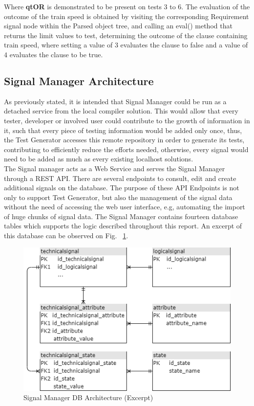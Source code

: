 Where \textbf{qtOR} is demonstrated to be present on tests 3 to 6. The evaluation of the outcome of the train speed is obtained by visiting the corresponding Requirement signal node within the Parsed object tree, and calling an eval() method that returns the limit values to test, determining the outcome of the clause containing train speed, where setting a value of 3 evaluates the clause to false and a value of 4 evaluates the clause to be true.


\subsection{Signal Manager Architecture}
\label{subsec:method_signal_manager}

As previously stated, it is intended that Signal Manager could be run as a detached service from the local compiler solution. This would allow that every tester, developer or involved user could contribute to the growth of information in it, such that every piece of testing information would be added only once, thus, the Test Generator accesses this remote repository in order to generate its tests, contributing to efficiently reduce the efforts needed, otherwise, every signal would need to be added as much as every existing localhost solutions.\\
The Signal manager acts as a Web Service and serves the Signal Manager through a REST API. There are several endpoints to consult, edit and create additional signals on the database. The purpose of these API Endpoints is not only to support Test Generator, but also the management of the signal data without the need of accessing the web user interface, e.g, automating the import of huge chunks of signal data. The Signal Manager contains fourteen database tables which supports the logic described throughout this report. An excerpt of this database can be observed on Fig. ~\ref{fig:db_signal_manager}.

\begin{figure}[H]
    \centering
    \includegraphics[scale=0.7]{images/signal_manager.png}
    \caption{Signal Manager DB Architecture (Excerpt)}
    \label{fig:db_signal_manager}
\end{figure}

